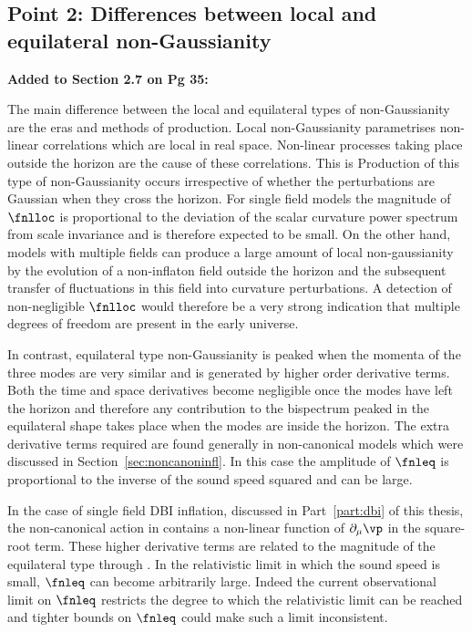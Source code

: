 \subsection{Point 2: Differences between local and equilateral non-Gaussianity}
\textbf{Added to Section 2.7 on Pg 35:}

 The main difference between the local and equilateral types of non-Gaussianity are the eras
and methods of production. Local
non-Gaussianity parametrises non-linear correlations which are local in real space. Non-linear
processes taking place outside the horizon are the cause of these correlations. This is   
Production of this type of non-Gaussianity occurs irrespective of whether the perturbations
are Gaussian when they cross the horizon. 
For single field models the magnitude
of $\fnlloc$ is proportional to the deviation of the scalar curvature power spectrum from scale
invariance and is therefore expected to be small. On the other hand, models with multiple fields 
can produce a large amount of local non-gaussianity by the evolution of a non-inflaton field 
outside the horizon and the subsequent transfer of fluctuations in this field into curvature
perturbations. A detection of non-negligible $\fnlloc$ would therefore be a very strong indication
that multiple degrees of freedom are present in the early universe.

In contrast, equilateral type non-Gaussianity is peaked when the momenta of the three modes are very
similar and is generated by higher order derivative terms. Both the time and space derivatives
become negligible once the modes have left the horizon and therefore any contribution to the
bispectrum peaked in the equilateral shape takes place when the modes are inside the
horizon. The extra derivative terms required are found generally in non-canonical models
which were discussed in Section~\ref{sec:noncanoninfl}. In this case the amplitude of $\fnleq$ is
proportional to the inverse of the sound speed squared and can be large.

In the case of single field DBI inflation, discussed in Part~\ref{part:dbi} of this thesis, the
non-canonical action in 
contains a non-linear function of $\partial_\mu \vp$ in the square-root term. These higher
derivative
terms are related to the magnitude of the equilateral type through . In the
relativistic limit in which the sound speed is small, $\fnleq$ can become arbitrarily large. Indeed
the current observational limit on $\fnleq$ restricts the degree to which the relativistic limit
can be reached and tighter bounds on $\fnleq$ could make such a limit inconsistent.

